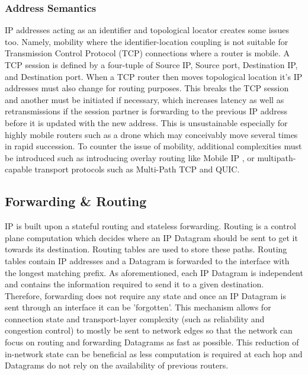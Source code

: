 \documentclass[12pt]{report}
\begin{document}
 \subsubsection{Address Semantics}
 IP addresses acting as an identifier and topological locator creates some issues too. Namely, mobility where the identifier-location coupling is not suitable for Transmission Control Protocol (TCP) connections where a router is mobile. A TCP session is defined by a four-tuple of Source IP, Source port, Destination IP, and Destination port.\cite{postel_transmission_1981} When a TCP router then moves topological location it's IP addresses must also change for routing purposes. This breaks the TCP session and another must be initiated if necessary, which increases latency as well as retransmissions if the session partner is forwarding to the previous IP address before it is updated with the new address. This is unsustainable especially for highly mobile routers such as a drone which may conceivably move several times in rapid succession. To counter the issue of mobility, additional complexities must be introduced such as introducing overlay routing like Mobile IP \cite{perkins_ip_1996}, or multipath-capable transport protocols such as Multi-Path TCP and QUIC.\cite{wischik_design_nodate}\cite{langley_quic_2017}

 \subsection{Forwarding \& Routing}
 IP is built upon a stateful routing and stateless forwarding. Routing is a control plane computation which decides where an IP Datagram should be sent to get it towards its destination. Routing tables are used to store these paths. Routing tables contain IP addresses and a Datagram is forwarded to the interface with the longest matching prefix. As aforementioned, each IP Datagram is independent and contains the information required to send it to a given destination. Therefore, forwarding does not require any state and once an IP Datagram is sent through an interface it can be 'forgotten'. This mechanism allows for connection state and transport-layer complexity (such as reliability and congestion control) to mostly be sent to network edges so that the network can focus on routing and forwarding Datagrams as fast as possible. This reduction of in-network state can be beneficial as less computation is required at each hop and Datagrams do not rely on the availability of previous routers.
\clearpage
\end{document}
